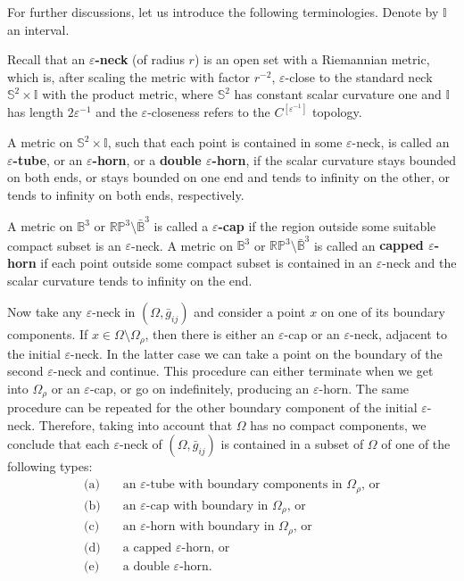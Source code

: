 For further discussions, let us introduce the following
terminologies. Denote by $\mathbb{I}$ an interval.

Recall that an {\bf $\varepsilon$-neck}
(of radius $r$) is an open set with a Riemannian metric, which is,
after scaling the metric with factor $r^{-2}$, $\varepsilon$-close
to the standard neck $\mathbb{S}^2\times \mathbb{I}$ with the
product metric, where $\mathbb{S}^2$ has constant scalar curvature
one and $\mathbb{I}$ has length $2\varepsilon^{-1}$ and the
$\varepsilon$-closeness refers to the $C^{[\varepsilon^{-1}]}$
topology.

A metric on $\mathbb{S}^2\times \mathbb{I}$, such that each point
is contained in some $\varepsilon$-neck, is called an {\bf
$\varepsilon$-tube}, or an {\bf
$\varepsilon$-horn}, or a {\bf double
$\varepsilon$-horn}, if the
scalar curvature stays bounded on both ends, or stays bounded on
one end and tends to infinity on the other, or tends to infinity
on both ends, respectively.

A metric on $\mathbb{B}^3$ or $\mathbb{RP}^3\setminus
\bar{\mathbb{B}}^3$ is called a {\bf
$\varepsilon$-cap} if the region outside
some suitable compact subset is an $\varepsilon$-neck. A metric on
$\mathbb{B}^3$ or $\mathbb{RP}^3\setminus \bar{\mathbb{B}}^3$ is
called an {\bf capped $\varepsilon$-horn} if each point outside some compact subset is
contained in an $\varepsilon$-neck and the scalar curvature tends
to infinity on the end.

Now take any $\varepsilon$-neck in $(\Omega,\bar{g}_{ij})$ and
consider a point $x$ on one of its boundary components. If $x\in
\Omega\setminus\Omega_\rho$, then there is either an
$\varepsilon$-cap or an $\varepsilon$-neck, adjacent to the
initial $\varepsilon$-neck. In the latter case we can take a point
on the boundary of the second $\varepsilon$-neck and continue.
This procedure can either terminate when we get into $\Omega_\rho$
or an $\varepsilon$-cap, or go on indefinitely, producing an
$\varepsilon$-horn. The same procedure can be repeated for the
other boundary component of the initial $\varepsilon$-neck.
Therefore, taking into account that $\Omega$ has no compact
components, we conclude that each $\varepsilon$-neck of
$(\Omega,\bar{g}_{ij})$ is contained in a subset of $\Omega$ of
one of the following types:
\begin{align}
\text{(a)}&\quad \text{an $\varepsilon$-tube with boundary
components in $\Omega_\rho$, or} \nonumber\\[1mm]
\text{(b)}&\quad \text{an $\varepsilon$-cap with boundary
in $\Omega_\rho$, or} \nonumber\\[1mm]
\text{(c)}&\quad \text{an $\varepsilon$-horn with boundary
in $\Omega_\rho$, or}\\[1mm]  %
\text{(d)}&\quad \text{a capped $\varepsilon$-horn, or} \nonumber\\[1mm]
\text{(e)}&\quad \text{a double $\varepsilon$-horn.} \nonumber
\end{align}

